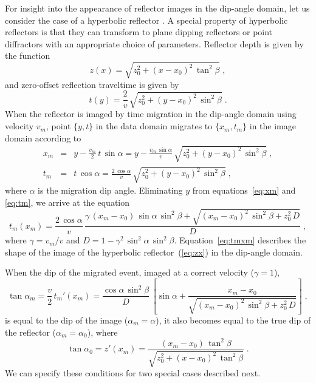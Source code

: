 For insight into the appearance of reflector images in the dip-angle domain, let us consider the case of a hyperbolic reflector \cite[]{fomel2013}. A special property of hyperbolic reflectors is that they can transform to plane dipping reflectors or point diffractors with an appropriate choice of parameters. 
Reflector depth is given by the function
\begin{equation}
\label{eq:zx}
z(x)=\sqrt{z_0^2+(x-x_0)^2\,\tan^2\beta}\;,
\end{equation}
and zero-offset reflection traveltime is given by
\begin{equation}
\label{eq:ty}
  t(y)=\frac{2}{v}\,\sqrt{z_0^2+(y-x_0)^2\,\sin^2\beta}\;.
\end{equation}
When the reflector is imaged by time migration in the dip-angle domain
\cite[]{sava03} using velocity $v_m$, point $\{y,t\}$ in
the data domain migrates to $\{x_m,t_m\}$ in the image domain
according to 
\begin{eqnarray}
\label{eq:xm}
x_m & = & y - \frac{v_m}{2}\,t\,\sin{\alpha} = \displaystyle y - \frac{v_m\,\sin{\alpha}}{v}\,\sqrt{z_0^2+(y-x_0)^2\,\sin^2\beta}\;, \\
\label{eq:tm}
t_m & = & t\,\cos{\alpha} = \displaystyle \frac{2\,\cos{\alpha}}{v}\,\sqrt{z_0^2+(y-x_0)^2\,\sin^2\beta}\;,
\end{eqnarray}
where $\alpha$ is the migration dip angle. Eliminating $y$ from
equations~\ref{eq:xm} and \ref{eq:tm}, we arrive at the equation
\begin{equation}
\label{eq:tmxm}
  t_m(x_m) = \frac{2\,\cos{\alpha}}{v}\,\frac{\gamma\,(x_m-x_0)\,\sin{\alpha}\,\sin^2{\beta} + \sqrt{(x_m-x_0)^2\,\sin^2{\beta}+z_0^2\,D}}{D}\;,
\end{equation}
where $\gamma=v_m/v$ and
$D=1-\gamma^2\,\sin^2{\alpha}\,\sin^2{\beta}$. Equation~\ref{eq:tmxm}
describes the shape of the image of the hyperbolic
reflector~(\ref{eq:zx}) in the dip-angle domain.

When the dip of the migrated event, imaged at a correct velocity ($\gamma=1$),
\begin{equation}
  \tan{\alpha_m} = \displaystyle \frac{v}{2}\,t_m'(x_m) = 
  \frac{\cos{\alpha}\,\sin^2{\beta}}{D}\,\left[\sin{\alpha} 
    + \frac{x_m-x_0}{\sqrt{(x_m-x_0)^2\,\sin^2{\beta}+z_0^2\,D}}\right]\;,
  \label{eq:alfam}
\end{equation}
is equal to the dip of the image ($\alpha_m=\alpha$), it also becomes
equal to the true dip of the reflector ($\alpha_m=\alpha_0$), where 
\begin{equation}
\label{eq:alfa0}
\tan{\alpha_0} = z'(x_m) = \frac{(x_m-x_0)\,\tan^2{\beta}}{\sqrt{z_0^2+(x-x_0)^2\,\tan^2\beta}}\;.
\end{equation}
We can specify these conditions for two special cases described next.


